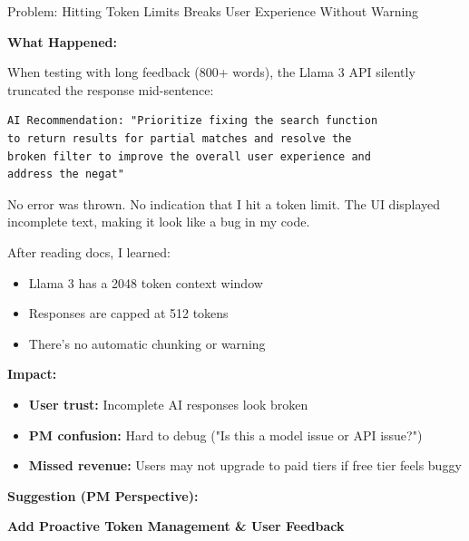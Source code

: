 \documentclass[11pt,a4paper]{article}
\begin{document}
\begin{insightbox}{Problem: Hitting Token Limits Breaks User Experience Without Warning}

\textbf{What Happened:}

When testing with long feedback (800+ words), the Llama 3 API silently truncated the response mid-sentence:

\begin{verbatim}
AI Recommendation: "Prioritize fixing the search function
to return results for partial matches and resolve the
broken filter to improve the overall user experience and
address the negat"
\end{verbatim}

No error was thrown. No indication that I hit a token limit. The UI displayed incomplete text, making it look like a bug in my code.

After reading docs, I learned:
\begin{itemize}
    \item Llama 3 has a 2048 token context window
    \item Responses are capped at 512 tokens
    \item There's no automatic chunking or warning
\end{itemize}

\vspace{0.5em}

\textbf{Impact:}
\begin{itemize}
    \item \textbf{User trust:} Incomplete AI responses look broken
    \item \textbf{PM confusion:} Hard to debug ("Is this a model issue or API issue?")
    \item \textbf{Missed revenue:} Users may not upgrade to paid tiers if free tier feels buggy
\end{itemize}

\end{insightbox}

\textbf{Suggestion (PM Perspective):}

\textcolor{cfOrange}{\textbf{Add Proactive Token Management \& User Feedback}}
\end{document}
